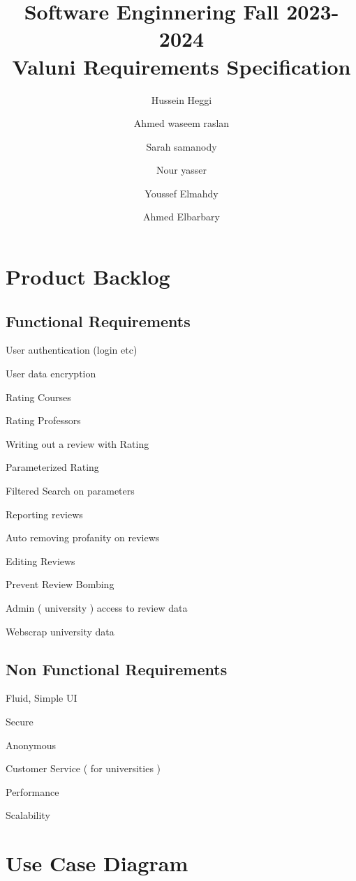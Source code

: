 \documentclass{article}
\title{Software Enginnering Fall 2023-2024 \\ Valuni Requirements Specification}
\author{  
Hussein Heggi 	\and
Ahmed waseem raslan 	\and
Sarah samanody 	\and
Nour yasser 	\and
Youssef Elmahdy	\and
Ahmed Elbarbary	}
\begin{document}
\maketitle

\section{Product Backlog}

\subsection{Functional Requirements}

	\quad User authentication (login etc)

	\quad User data encryption

	\quad Rating Courses

	\quad Rating Professors

	\quad Writing out a review with Rating

	\quad Parameterized Rating

	\quad Filtered Search on parameters

	\quad Reporting reviews

	\quad Auto removing profanity on reviews

	\quad Editing Reviews

	\quad Prevent Review Bombing

	\quad Admin ( university ) access to review data

	\quad Webscrap university data

\subsection{Non Functional Requirements} 

	\quad Fluid, Simple UI

	\quad Secure

	\quad Anonymous

	\quad Customer Service ( for universities )

	\quad Performance

	\quad Scalability

\section{Use Case Diagram} 
\end{document}
